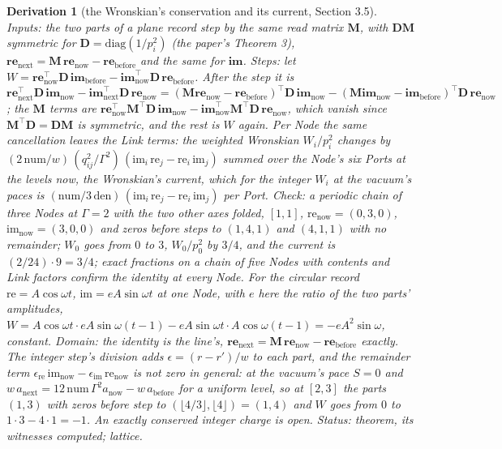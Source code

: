 \documentclass[pdflatex,sn-mathphys-num]{sn-jnl}
\newcommand{\num}{\mathrm{num}}
\newcommand{\den}{\mathrm{den}}
\newcommand{\anow}{a_{\mathrm{now}}}
\newcommand{\abefore}{a_{\mathrm{before}}}
\newcommand{\anext}{a_{\mathrm{next}}}
\theoremstyle{thmstyleone}
\newtheorem{derivation}{Derivation}
\begin{document}
\begin{derivation}[the Wronskian's conservation and its current, Section 3.5]
\emph{Inputs:} the two parts of a plane record step by the same read matrix $\mathbf M$, with $\mathbf D\mathbf M$ symmetric for $\mathbf D = \mathrm{diag}(1 / p_i^2)$ (the paper's Theorem 3), $\mathbf{re}_{\mathrm{next}} = \mathbf M\,\mathbf{re}_{\mathrm{now}} - \mathbf{re}_{\mathrm{before}}$ and the same for $\mathbf{im}$. \emph{Steps:} let $W = \mathbf{re}_{\mathrm{now}}^\top\mathbf D\,\mathbf{im}_{\mathrm{before}} - \mathbf{im}_{\mathrm{now}}^\top\mathbf D\,\mathbf{re}_{\mathrm{before}}$. After the step it is $\mathbf{re}_{\mathrm{next}}^\top\mathbf D\,\mathbf{im}_{\mathrm{now}} - \mathbf{im}_{\mathrm{next}}^\top\mathbf D\,\mathbf{re}_{\mathrm{now}} = (\mathbf M\mathbf{re}_{\mathrm{now}} - \mathbf{re}_{\mathrm{before}})^\top\mathbf D\,\mathbf{im}_{\mathrm{now}} - (\mathbf M\mathbf{im}_{\mathrm{now}} - \mathbf{im}_{\mathrm{before}})^\top\mathbf D\,\mathbf{re}_{\mathrm{now}}$; the $\mathbf M$ terms are $\mathbf{re}_{\mathrm{now}}^\top\mathbf M^\top\mathbf D\,\mathbf{im}_{\mathrm{now}} - \mathbf{im}_{\mathrm{now}}^\top\mathbf M^\top\mathbf D\,\mathbf{re}_{\mathrm{now}}$, which vanish since $\mathbf M^\top\mathbf D = \mathbf D\mathbf M$ is symmetric, and the rest is $W$ again. Per Node the same cancellation leaves the Link terms: the weighted Wronskian $W_i / p_i^2$ changes by $(2\,\num / w)\,(q_{ij}^2 / \Gamma^2)\,(\mathrm{im}_i\,\mathrm{re}_j - \mathrm{re}_i\,\mathrm{im}_j)$ summed over the Node's six Ports at the levels now, the Wronskian's current, which for the integer $W_i$ at the vacuum's paces is $(\num / 3\,\den)\,(\mathrm{im}_i\,\mathrm{re}_j - \mathrm{re}_i\,\mathrm{im}_j)$ per Port. \emph{Check:} a periodic chain of three Nodes at $\Gamma = 2$ with the two other axes folded, $[1, 1]$, $\mathrm{re}_{\mathrm{now}} = (0, 3, 0)$, $\mathrm{im}_{\mathrm{now}} = (3, 0, 0)$ and zeros before steps to $(1, 4, 1)$ and $(4, 1, 1)$ with no remainder; $W_0$ goes from $0$ to $3$, $W_0 / p_0^2$ by $3 / 4$, and the current is $(2 / 24)\cdot 9 = 3 / 4$; exact fractions on a chain of five Nodes with contents and Link factors confirm the identity at every Node. For the circular record $\mathrm{re} = A\cos\omega t$, $\mathrm{im} = eA\sin\omega t$ at one Node, with $e$ here the ratio of the two parts' amplitudes, $W = A\cos\omega t\cdot eA\sin\omega(t - 1) - eA\sin\omega t\cdot A\cos\omega(t - 1) = -eA^2\sin\omega$, constant. \emph{Domain:} the identity is the line's, $\mathbf{re}_{\mathrm{next}} = \mathbf M\,\mathbf{re}_{\mathrm{now}} - \mathbf{re}_{\mathrm{before}}$ exactly. The integer step's division adds $\epsilon = (r - r') / w$ to each part, and the remainder term $\epsilon_{\mathrm{re}}\,\mathrm{im}_{\mathrm{now}} - \epsilon_{\mathrm{im}}\,\mathrm{re}_{\mathrm{now}}$ is not zero in general: at the vacuum's pace $S = 0$ and $w\,\anext = 12\,\num\,\Gamma^2\anow - w\,\abefore$ for a uniform level, so at $[2, 3]$ the parts $(1, 3)$ with zeros before step to $(\lfloor 4 / 3\rfloor, \lfloor 4\rfloor) = (1, 4)$ and $W$ goes from $0$ to $1\cdot 3 - 4\cdot 1 = -1$. An exactly conserved integer charge is open.
 \emph{Status:} theorem, its witnesses computed; lattice.
\end{derivation}
\end{document}
